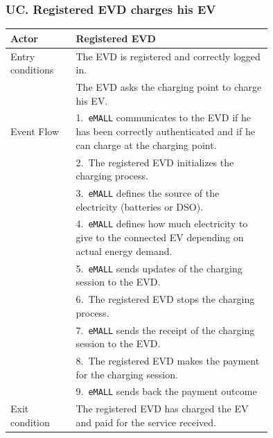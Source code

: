 \subsubsection*{UC\cuc . Registered EVD charges his EV}
\begin{center}
    \begin{longtable}{lp{0.75\linewidth}}
        \hline
        Actor            & Registered EVD                                                                                                              \\
        \hline
        Entry conditions & The EVD is registered and correctly logged in.                                                                              \\
        & The EVD asks the charging point to charge his EV.                                                                           \\
        \hline
        Event Flow       & 1.\ \verb|eMALL| communicates to the EVD if he has been correctly authenticated and if he can charge at the charging point. \\
        & 2.\ The registered EVD initializes the charging process.                                                                    \\
        & 3.\ \verb|eMALL| defines the source of the electricity (batteries or DSO).                                                  \\
        & 4.\ \verb|eMALL| defines how much electricity to give to the connected EV depending on actual energy demand.                \\
        & 5.\ \verb|eMALL| sends updates of the charging session to the EVD.                                                          \\
        & 6.\ The registered EVD stops the charging process.                                                                          \\
        & 7.\ \verb|eMALL| sends the receipt of the charging session to the EVD.                                                      \\
        & 8.\ The registered EVD makes the payment for the charging session.                                                          \\
        & 9.\ \verb|eMALL| sends back the payment outcome                                                                             \\
        \hline
        Exit condition   & The registered EVD has charged the EV and paid for the service received.                                                    \\

\end{longtable}
\end{center}

